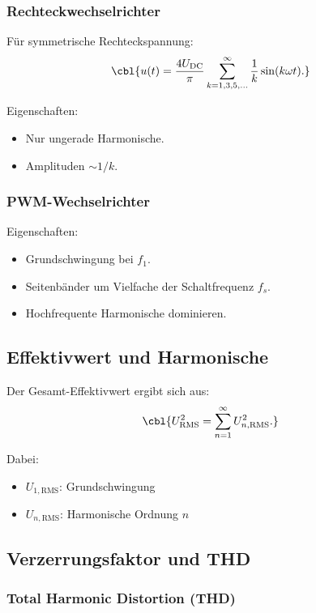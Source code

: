 \subsubsection{Rechteckwechselrichter}

Für symmetrische Rechteckspannung:
\[
\cbl{u(t) = \frac{4 U_{\mathrm{DC}}}{\pi}
\sum_{k=1,3,5,\dots}^{\infty} \frac{1}{k} \sin(k \omega t).}
\]

Eigenschaften:
\begin{itemize}
    \item Nur ungerade Harmonische.
    \item Amplituden $\sim 1/k$.
\end{itemize}

\subsubsection{PWM-Wechselrichter}

Eigenschaften:
\begin{itemize}
    \item Grundschwingung bei $f_1$.
    \item Seitenbänder um Vielfache der Schaltfrequenz $f_s$.
    \item Hochfrequente Harmonische dominieren.
\end{itemize}




\subsection{Effektivwert und Harmonische}

Der Gesamt-Effektivwert ergibt sich aus:
\[
\cbl{U_{\mathrm{RMS}}^2 = \sum_{n=1}^{\infty} U_{n,\mathrm{RMS}}^2.}
\]

Dabei:
\begin{itemize}
    \item $U_{1,\mathrm{RMS}}$: Grundschwingung
    \item $U_{n,\mathrm{RMS}}$: Harmonische Ordnung $n$
\end{itemize}

\subsection{Verzerrungsfaktor und THD}

\subsubsection{Total Harmonic Distortion (THD)}

